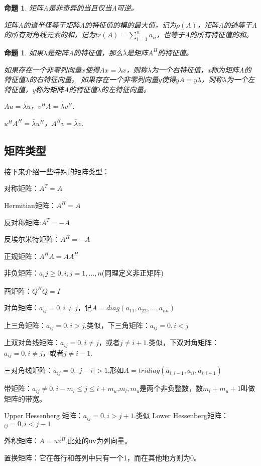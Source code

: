 \documentclass{article}
\begin{document}
\newtheorem{thm}{命题}
\begin{thm}
矩阵A是非奇异的当且仅当A可逆。

矩阵A的谱半径等于矩阵A的特征值的模的最大值，记为$\rho (A)$，矩阵A的迹等于A的所有对角线元素的和，记为$tr(A)=\sum_{i=1}^n a_{ii}$，也等于A的所有特征值的和。
\end{thm}
\newtheorem{thm}{命题}
\begin{thm}
如果$\lambda$是矩阵A的特征值，那么$\bar\lambda$是矩阵$A^H$的特征值。

如果存在一个非零列向量$x$使得$Ax=\lambda x$，则称$\lambda $为一个右特征值，x称为矩阵A的特征值$\lambda $的右特征向量。
如果存在一个非零列向量$y$使得$yA=y\lambda$，则称$\lambda $为一个左特征值，y称为矩阵A的特征值$\lambda $的左特征向量。

$Au=\lambda u$，$v^HA=\lambda v^H$.

$u^HA^H=\bar{\lambda}u^H$，$A^Hv=\bar{\lambda}v$.
\end{thm}

\subsection{矩阵类型}
接下来介绍一些特殊的矩阵类型：

对称矩阵：$A^T=A$

Hermitian矩阵：$A^H=A$

反对称矩阵:$A^T=-A$

反埃尔米特矩阵：$A^H=-A$

正规矩阵：$A^HA=AA^H$

非负矩阵：$a_({j}\ge 0,i,j=1,...,n$(同理定义非正矩阵)

酉矩阵：$Q^HQ=I$

对角矩阵：$a_{ij}=0,i\neq j$，记$A=diag(a_{11},a_{22},...,a_{nn})$

上三角矩阵：$a_{ij}=0,i>j$,类似，下三角矩阵：$a_{ij}=0,i<j$

上双对角线矩阵：$a_{ij}=0,i\neq j$，或者$j\neq i+1$.类似，下双对角矩阵：$a_{ij}=0,i\neq j$，或者$j\neq i-1$.

三对角线矩阵：$a_{ij}=0,|j-i|>1$,形如$A=tridiag(a_{i,i-1},a_{ii},a_{i,i+1})$

带矩阵：$a_{ij}\neq 0,i-m_l\leqslant j\leqslant i+m_u$,$m_l,m_u$是两个非负整数，数$m_l+m_u+1$叫做矩阵的带宽。

Upper Hessenberg 矩阵：$a_{ij}=0,i>j+1$.类似 Lower Hessenberg矩阵：$_{ij}=0,i<j-1$

外积矩阵：$A=uv^H$,此处的uv为列向量。

置换矩阵：它在每行和每列中只有一个1，而在其他地方则为0。
\end{document}
